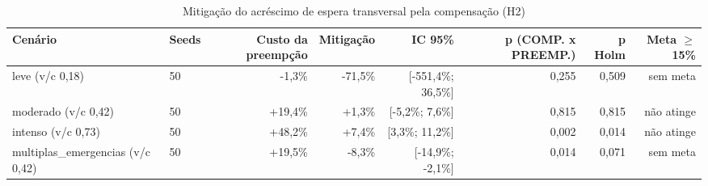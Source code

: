 \begin{table}[htbp]
\centering
\caption{Mitigação do acréscimo de espera transversal pela compensação (H2)}
\label{tab:t3b}
\small
\begin{tabular}{llrrrrrr}
\toprule
Cenário & Seeds & Custo da preempção & Mitigação & IC 95\% & p (COMP. x PREEMP.) & p Holm & Meta $\geq$ 15\% \\
\midrule
leve (v/c 0,18) & 50 & -1,3\% & -71,5\% & [-551,4\%; 36,5\%] & 0,255 & 0,509 & sem meta \\
moderado (v/c 0,42) & 50 & +19,4\% & +1,3\% & [-5,2\%; 7,6\%] & 0,815 & 0,815 & não atinge \\
intenso (v/c 0,73) & 50 & +48,2\% & +7,4\% & [3,3\%; 11,2\%] & 0,002 & 0,014 & não atinge \\
multiplas\_emergencias (v/c 0,42) & 50 & +19,5\% & -8,3\% & [-14,9\%; -2,1\%] & 0,014 & 0,071 & sem meta \\
\bottomrule
\end{tabular}
\end{table}
